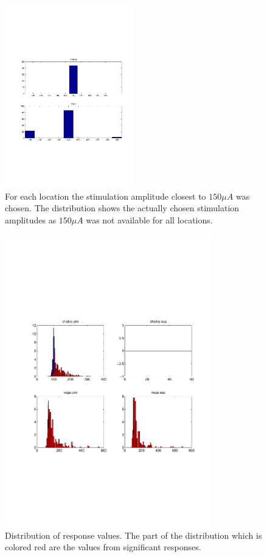 \begin{figure}[ht]
	\centering
		\includegraphics[width=0.5\textwidth]{images/stim_amp_dist.pdf}
	\caption{
		For each location the stimulation amplitude closest to $150 \mu A$ was chosen. The distribution shows the actually chosen stimulation amplitudes as $150 \mu A$ was not available for all locations.}
	\label{sg:fig:stimamp_dist}
\end{figure}
\begin{figure}[ht]
    \centering
        \includegraphics[width=0.8\textwidth]{images/response_dist.pdf}
    \caption{Distribution of response values. The part of the distribution which is colored red are the values from significant responses.}
    \label{sg:fig:images_response_dist}
\end{figure}


